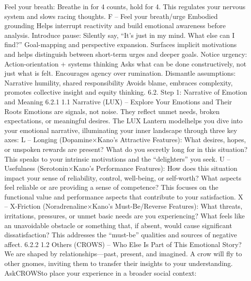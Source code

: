 Feel your breath: Breathe in for 4 counts, hold for 4. This regulates your nervous system and
slows racing thoughts. F – Feel your breath/urge Embodied grounding Helps interrupt reactivity
and build emotional awareness before analysis.
Introduce pause: Silently say, “It’s just in my mind. What else can I find?” Goal-mapping and
perspective expansion. Surfaces implicit motivations and helps distinguish between short-term urges
and deeper goals.
Notice urgency: Action-orientation + systems thinking Asks what can be done constructively,
not just what is felt. Encourages agency over rumination.
Dismantle assumptions: Narrative humility, shared responsibility Avoids blame, embraces
complexity, promotes collective insight and equity thinking.
6.2. Step 1: Narrative of Emotion and Meaning
6.2.1 1.1 Narrative (LUX) – Explore Your Emotions and Their Roots
Emotions are signals, not noise. They reflect unmet needs, broken expectations, or meaningful desires. The
LUX Lantern modelhelps you dive into your emotional narrative, illuminating your inner landscape
through three key axes:
L – Longing (Dopamine×Kano’s Attractive Features): What desires, hopes, or unspoken
rewards are present? What do you secretly long for in this situation? This speaks to your intrinsic
motivations and the “delighters” you seek.
U – Usefulness (Serotonin×Kano’s Performance Features): How does this situation
impact your sense of reliability, control, well-being, or self-worth? What aspects feel reliable or are
providing a sense of competence? This focuses on the functional value and performance aspects
that contribute to your satisfaction.
X – X-Friction (Noradrenaline×Kano’s Must-Be/Reverse Features): What threats,
irritations, pressures, or unmet basic needs are you experiencing? What feels like an unavoidable
obstacle or something that, if absent, would cause significant dissatisfaction? This addresses the
“must-be” qualities and sources of negative affect.
6.2.2 1.2 Others (CROWS) – Who Else Is Part of This Emotional Story?
We are shaped by relationships—past, present, and imagined. A crow will fly to other gnomes, inviting
them to transfer their insights to your understanding. AskCROWSto place your experience in a
broader social context:

